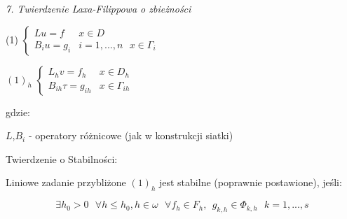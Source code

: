 \textit{7. Twierdzenie Laxa-Filippowa o zbieżności}

(1) $\left\{\begin{matrix} Lu = f & x \in D \\ B_iu = g_i & i = 1,...,n\ \ \ x \in \Gamma _i \end{matrix}\right.$

$(1)_h$ $\left\{\begin{matrix} L_hv = f_h & x \in D_h \\ B_{ih} \tau = g_{ih} & x \in \Gamma _{ih} \end{matrix}\right.$

gdzie:

$L$,$B_i$ - operatory różnicowe (jak w konstrukcji siatki)

Twierdzenie o Stabilności:

Liniowe zadanie przybliżone $(1)_h$ jest stabilne (poprawnie postawione), jeśli:

\[ \exists h_0 > 0 \ \ \ \forall h \leqslant h_0 , h \in \omega \ \ \ \forall f_h \in F_h,\ \  g_{k,h} \in \Phi _{k,h}\ \ \ k = 1,...,s\]